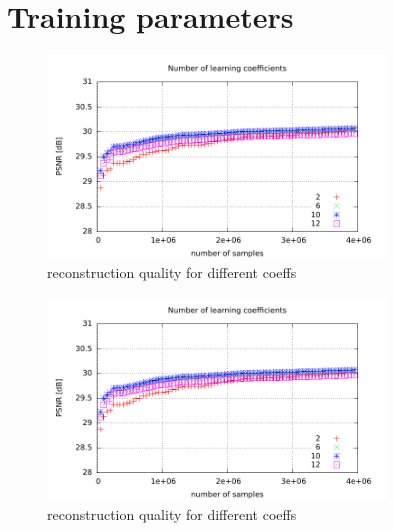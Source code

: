 \section{Training parameters}
\begin{figure}[h]
\centering
\includegraphics[width = 0.8\textwidth]{../tests/results/coeffsConverg.pdf}
\caption{reconstruction quality for different coeffs}
\label{fig:dict size}
\end{figure}
\begin{figure}[h]
\centering
\includegraphics[width = 0.8\textwidth]{../tests/results/coeffsConverg.pdf}
\caption{reconstruction quality for different coeffs}
\label{fig:dict size}
\end{figure}


